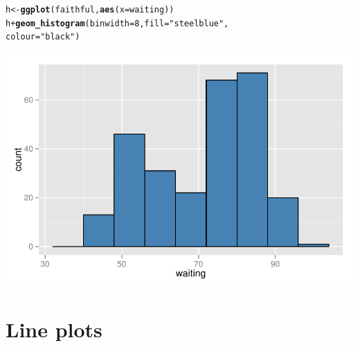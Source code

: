 \documentclass{beamer}\usepackage[]{graphicx}\usepackage[]{color}
\makeatletter
\newcommand{\hlnum}[1]{\textcolor[rgb]{0.686,0.059,0.569}{#1}}%
\newcommand{\hlstr}[1]{\textcolor[rgb]{0.192,0.494,0.8}{#1}}%
\newcommand{\hlopt}[1]{\textcolor[rgb]{0,0,0}{#1}}%
\newcommand{\hlstd}[1]{\textcolor[rgb]{0.345,0.345,0.345}{#1}}%
\newcommand{\hlkwb}[1]{\textcolor[rgb]{0.69,0.353,0.396}{#1}}%
\newcommand{\hlkwc}[1]{\textcolor[rgb]{0.333,0.667,0.333}{#1}}%
\newcommand{\hlkwd}[1]{\textcolor[rgb]{0.737,0.353,0.396}{\textbf{#1}}}%
\newenvironment{kframe}{%
 \def\at@end@of@kframe{}%
 \ifinner\ifhmode%
  \def\at@end@of@kframe{\end{minipage}}%
  \begin{minipage}{\columnwidth}%
 \fi\fi%
 \def\FrameCommand##1{\hskip\@totalleftmargin \hskip-\fboxsep
 \colorbox{shadecolor}{##1}\hskip-\fboxsep
     \hskip-\linewidth \hskip-\@totalleftmargin \hskip\columnwidth}%
 \MakeFramed {\advance\hsize-\width
   \@totalleftmargin\z@ \linewidth\hsize
   \@setminipage}}%
 {\par\unskip\endMakeFramed%
 \at@end@of@kframe}
\newenvironment{knitrout}{}{} %
\makeatother
\begin{document}
\begin{frame}[fragile]
\begin{knitrout}\footnotesize
{}\color{fgcolor}\begin{kframe}
\begin{alltt}
\hlstd{h} \hlkwb{<-} \hlkwd{ggplot}\hlstd{(faithful,} \hlkwd{aes}\hlstd{(}\hlkwc{x} \hlstd{= waiting))}
\hlstd{h} \hlopt{+} \hlkwd{geom_histogram}\hlstd{(}\hlkwc{binwidth} \hlstd{=} \hlnum{8}\hlstd{,} \hlkwc{fill} \hlstd{=} \hlstr{"steelblue"}\hlstd{,}
\hlkwc{colour} \hlstd{=} \hlstr{"black"}\hlstd{)}
\end{alltt}
\end{kframe}

{\centering \includegraphics[width=.75\linewidth]{figure/histogra} 

}



\end{knitrout}
\end{frame}


\section*{Line plots}
\frame{\sectionpage}

\end{document}

